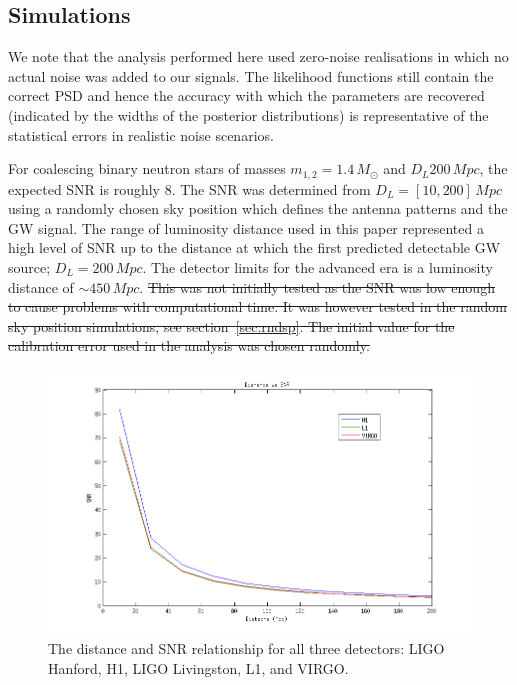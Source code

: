 \documentclass[12pt]{iopart}
\begin{document}
\subsection{Simulations}

We note that the analysis performed here used zero-noise realisations in which
no actual noise was added to our signals.  The likelihood functions still
contain the correct \ac{PSD} and hence the accuracy with which the parameters
are recovered (indicated by the widths of the posterior distributions) is
representative of the statistical errors in realistic noise scenarios.



For coalescing binary neutron stars of masses
$m_{1,2} = 1.4\,M_{\odot}$ and  $D_{L}200\,Mpc$, the expected SNR is roughly 8.
The SNR was determined from $D_{L} = [10,200]\,Mpc$  using a randomly chosen
sky position which defines the antenna patterns and the GW signal. The range of
luminosity distance used in this paper represented a high level of SNR up to
the distance at which the first predicted detectable GW source; $D_{L} =
200\,Mpc$. The detector limits for the advanced era is a luminosity distance of
$\sim 450\,Mpc$. \sout{This was not initially tested as the SNR was low enough to
cause problems with computational time. It was however tested in the random sky
position simulations, see section~\ref{sec:rndsp}. The initial value for the
calibration error used in the analysis was chosen randomly.}

\begin{figure}
  \centering
  \includegraphics[width = \textwidth]{DvsSNR-mult-det}
  \caption{The distance and SNR relationship for all three detectors:
LIGO Hanford, H1, LIGO Livingston, L1, and VIRGO.}
  \label{fig:distsnr}
\end{figure}
\end{document}
